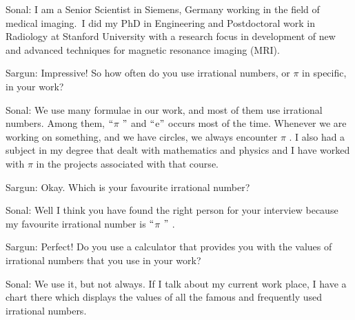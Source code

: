 \documentclass[12pt]{article}
\begin{document}
\begin{justify}
Sonal: I am a Senior Scientist in Siemens, Germany working in the field of medical imaging. I did my PhD in Engineering and Postdoctoral work in Radiology at Stanford University with a research focus in development of new and advanced techniques for magnetic resonance imaging (MRI).
\end{justify}\par

\begin{justify}
Sargun: Impressive! So how often do you use irrational numbers, or $ \pi $  in specific, in your work? 
\end{justify}\par

\begin{justify}
Sonal: We use many formulae in our work, and most of them use irrational numbers. Among them, $``$$ \pi $ $"$  and $``$e$"$  occurs most of the time. Whenever we are working on something, and we have circles, we always encounter $ \pi $ . I also had a subject in my degree that dealt with mathematics and physics and I have worked with $ \pi $  in the projects associated with that course. 
\end{justify}\par

\begin{justify}
Sargun: Okay. Which is your favourite irrational number?
\end{justify}\par

\begin{justify}
Sonal: Well I think you have found the right person for your interview because my favourite irrational number is $``$$ \pi $ $"$ .
\end{justify}\par

\begin{justify}
Sargun: Perfect! Do you use a calculator that provides you with the values of irrational numbers that you use in your work?
\end{justify}\par

\begin{justify}
Sonal: We use it, but not always. If I talk about my current work place, I have a chart there which displays the values of all the famous and frequently used irrational numbers.
\end{justify}\par
\end{document}
